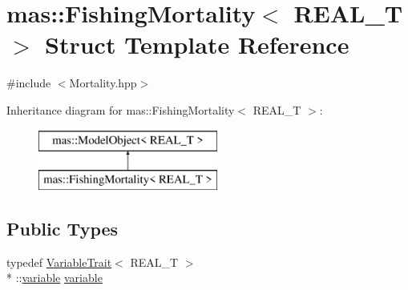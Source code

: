 \hypertarget{structmas_1_1_fishing_mortality}{\section{mas\-:\-:Fishing\-Mortality$<$ R\-E\-A\-L\-\_\-\-T $>$ Struct Template Reference}
\label{structmas_1_1_fishing_mortality}
}


{\ttfamily \#include $<$Mortality.\-hpp$>$}

Inheritance diagram for mas\-:\-:Fishing\-Mortality$<$ R\-E\-A\-L\-\_\-\-T $>$\-:\begin{figure}[H]
\begin{center}
\leavevmode
\includegraphics[height=2.000000cm]{structmas_1_1_fishing_mortality}
\end{center}
\end{figure}
\subsection*{Public Types}
\begin{DoxyCompactItemize}
\item 
typedef \hyperlink{structmas_1_1_variable_trait}{Variable\-Trait}$<$ R\-E\-A\-L\-\_\-\-T $>$\\*
\-::\hyperlink{structmas_1_1_fishing_mortality_ad7a9ae18fb1cbfe1bf7c2fa0b3e1ee73}{variable} \hyperlink{structmas_1_1_fishing_mortality_ad7a9ae18fb1cbfe1bf7c2fa0b3e1ee73}{variable}
\end{DoxyCompactItemize}
